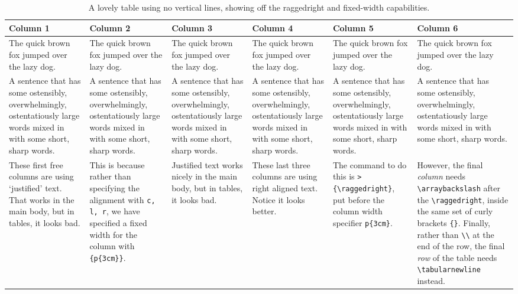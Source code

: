 \documentclass[main.tex]{subfiles}
\begin{document}
\footnotesize
\begin{table}[h!]
\caption[Large, landscape, fixed-width, right-aligned table]{A lovely table using no vertical lines, showing off the raggedright and fixed-width capabilities.} %
\centering %
\begin{tabular}{p{3cm}p{3cm}p{3cm}>{\raggedright}p{3cm}>{\raggedright}p{3cm}>{\raggedright\arraybackslash}p{3cm}}
\toprule
Column 1&Column 2&Column 3&Column 4&Column 5&Column 6\\
\midrule
The quick brown fox jumped over the lazy dog.&The quick brown fox jumped over the lazy dog.&The quick brown fox jumped over the lazy dog.&The quick brown fox jumped over the lazy dog.&The quick brown fox jumped over the lazy dog.&The quick brown fox jumped over the lazy dog.\\
\midrule
A sentence that has some ostensibly, overwhelmingly, ostentatiously large words mixed in with some short, sharp words.&A sentence that has some ostensibly, overwhelmingly, ostentatiously large words mixed in with some short, sharp words.&A sentence that has some ostensibly, overwhelmingly, ostentatiously large words mixed in with some short, sharp words.&A sentence that has some ostensibly, overwhelmingly, ostentatiously large words mixed in with some short, sharp words.&A sentence that has some ostensibly, overwhelmingly, ostentatiously large words mixed in with some short, sharp words.&A sentence that has some ostensibly, overwhelmingly, ostentatiously large words mixed in with some short, sharp words.\\
\midrule
These first free columns are using `justified' text. That works in the main body, but in tables, it looks bad.&This is because rather than specifying the alignment with \texttt{c, l, r}, we have specified a fixed width for the column with \verb|{p{3cm}}|.&Justified text works nicely in the main body, but in tables, it looks bad.&These last three columns are using right aligned text. Notice it looks better.&The command to do this is \verb|>{\raggedright}|, put before the column width specifier \verb|p{3cm}|.&However, the final \emph{column} needs \verb|\arraybackslash| after the \verb|\raggedright|, inside the same set of curly brackets \verb|{}|. Finally, rather than \verb|\\| at the end of the row, the final \emph{row} of the table needs \verb|\tabularnewline| instead. \tabularnewline

\bottomrule
\end{tabular}
\label{tab:landscape}
\end{table}
\end{document}
